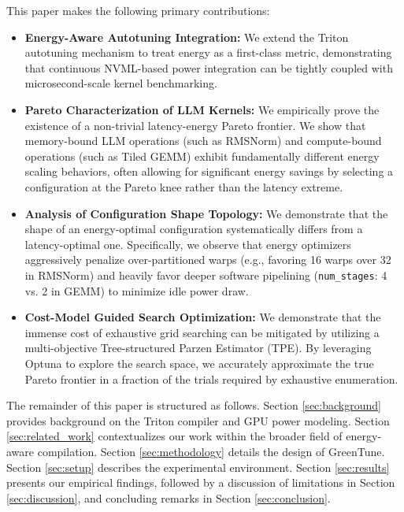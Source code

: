 This paper makes the following primary contributions:
\begin{itemize}
    \item \textbf{Energy-Aware Autotuning Integration:} We extend the Triton autotuning mechanism to treat energy as a first-class metric, demonstrating that continuous NVML-based power integration can be tightly coupled with microsecond-scale kernel benchmarking.
    \item \textbf{Pareto Characterization of LLM Kernels:} We empirically prove the existence of a non-trivial latency-energy Pareto frontier. We show that memory-bound LLM operations (such as RMSNorm) and compute-bound operations (such as Tiled GEMM) exhibit fundamentally different energy scaling behaviors, often allowing for significant energy savings by selecting a configuration at the Pareto knee rather than the latency extreme.
    \item \textbf{Analysis of Configuration Shape Topology:} We demonstrate that the shape of an energy-optimal configuration systematically differs from a latency-optimal one. Specifically, we observe that energy optimizers aggressively penalize over-partitioned warps (e.g., favoring 16 warps over 32 in RMSNorm) and heavily favor deeper software pipelining (\texttt{num\_stages}: 4 vs. 2 in GEMM) to minimize idle power draw.
    \item \textbf{Cost-Model Guided Search Optimization:} We demonstrate that the immense cost of exhaustive grid searching can be mitigated by utilizing a multi-objective Tree-structured Parzen Estimator (TPE). By leveraging Optuna to explore the search space, we accurately approximate the true Pareto frontier in a fraction of the trials required by exhaustive enumeration.
\end{itemize}

The remainder of this paper is structured as follows. Section \ref{sec:background} provides background on the Triton compiler and GPU power modeling. Section \ref{sec:related_work} contextualizes our work within the broader field of energy-aware compilation. Section \ref{sec:methodology} details the design of GreenTune. Section \ref{sec:setup} describes the experimental environment. Section \ref{sec:results} presents our empirical findings, followed by a discussion of limitations in Section \ref{sec:discussion}, and concluding remarks in Section \ref{sec:conclusion}.
